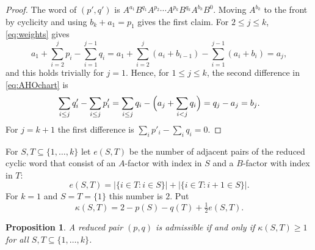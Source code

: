 \documentclass{amsart}
\newtheorem{proposition}[theorem]{Proposition}
\theoremstyle{definition}
\theoremstyle{remark}
\numberwithin{equation}{section}
\newcommand{\cut}{\kappa}
\begin{document}
\begin{proof}
The word of $(p',q')$ is $A^{a_1}B^{q_1}A^{p_2}\cdots A^{p_k}B^{q_k}A^{b_k}B^0$. Moving $A^{b_k}$ to the front by cyclicity and using $b_k+a_1=p_1$ gives the first claim. For $2\le j\le k$, \eqref{eq:weights} gives
\[
a_1+\sum_{i=2}^{j}p_i-\sum_{i=1}^{j-1}q_i
=a_1+\sum_{i=2}^{j}(a_i+b_{i-1})-\sum_{i=1}^{j-1}(a_i+b_i)=a_j,
\]
and this holds trivially for $j=1$. Hence, for $1\le j\le k$, the second difference in \eqref{eq:AHOchart} is
\[
\sum_{i\le j}q'_i-\sum_{i\le j}p'_i=\sum_{i\le j}q_i-\Bigl(a_j+\sum_{i<j}q_i\Bigr)=q_j-a_j=b_j .
\]
For $j=k+1$ the first difference is $\sum_ip'_i-\sum_iq_i=0$.
\end{proof}

For $S,T\subseteq\{1,\dots,k\}$ let $e(S,T)$ be the number of adjacent pairs of the reduced cyclic word that consist of an $A$-factor with index in $S$ and a $B$-factor with index in $T$:
\[
e(S,T)=|\{i\in T:i\in S\}|+|\{i\in T:i+1\in S\}| .
\]
For $k=1$ and $S=T=\{1\}$ this number is $2$. Put
\begin{equation}\label{eq:capacity}
\cut(S,T)=2-p(S)-q(T)+\tfrac12 e(S,T).
\end{equation}

\begin{proposition}\label{prop:cut}
A reduced pair $(p,q)$ is admissible if and only if $\cut(S,T)\ge 1$ for all $S,T\subseteq\{1,\dots,k\}$.
\end{proposition}
\end{document}
